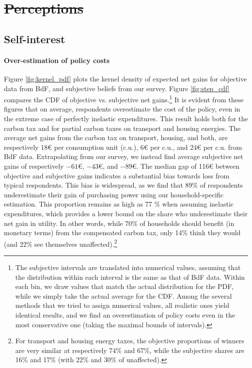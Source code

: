 \documentclass[12pt]{article} %
\providecommand{\DIFaddtex}[1]{{\protect\color{blue}\uwave{#1}}} %
\providecommand{\DIFdeltex}[1]{{\protect\color{red}\sout{#1}}}                      %
\providecommand{\DIFaddbegin}{} %
\providecommand{\DIFaddend}{} %
\providecommand{\DIFdelbegin}{} %
\providecommand{\DIFdelend}{} %
\providecommand{\DIFadd}[1]{\texorpdfstring{\DIFaddtex{#1}}{#1}} %
\providecommand{\DIFdel}[1]{\texorpdfstring{\DIFdeltex{#1}}{}} %
\newcommand{\DIFscaledelfig}{0.5}
\newlength{\DIFdelgraphicswidth} %
\newlength{\DIFdelgraphicsheight} %
\newcommand{\DIFaddincludegraphics}[2][]{{\color{blue}\fbox{\DIFOincludegraphics[#1]{#2}}}} %
\newcommand{\DIFdelincludegraphics}[2][]{%
\sbox{\DIFdelgraphicsbox}{\DIFOincludegraphics[#1]{#2}}%
\settoboxwidth{\DIFdelgraphicswidth}{\DIFdelgraphicsbox} %
\settoboxtotalheight{\DIFdelgraphicsheight}{\DIFdelgraphicsbox} %
\scalebox{\DIFscaledelfig}{%
\parbox[b]{\DIFdelgraphicswidth}{\usebox{\DIFdelgraphicsbox}\\[-\baselineskip] \rule{\DIFdelgraphicswidth}{0em}}\llap{\resizebox{\DIFdelgraphicswidth}{\DIFdelgraphicsheight}{%
\setlength{\unitlength}{\DIFdelgraphicswidth}%
\begin{picture}(1,1)%
\thicklines\linethickness{2pt} %
{\color[rgb]{1,0,0}\put(0,0){\framebox(1,1){}}}%
{\color[rgb]{1,0,0}\put(0,0){\line( 1,1){1}}}%
{\color[rgb]{1,0,0}\put(0,1){\line(1,-1){1}}}%
\end{picture}%
}\hspace*{3pt}}} %
} %
\DeclareRobustCommand{\DIFaddbegin}{\DIFOaddbegin \let\includegraphics\DIFaddincludegraphics} %
\DeclareRobustCommand{\DIFaddend}{\DIFOaddend \let\includegraphics\DIFOincludegraphics} %
\DeclareRobustCommand{\DIFdelbegin}{\DIFOdelbegin \let\includegraphics\DIFdelincludegraphics} %
\DeclareRobustCommand{\DIFdelend}{\DIFOaddend \let\includegraphics\DIFOincludegraphics} %
\begin{document}
\section{\DIFdelbegin \DIFdel{Perceptions}\DIFdelend \DIFaddbegin \DIFadd{Biased beliefs}\DIFaddend }\label{sec:perceptions}

    \subsection{Self-interest}\label{subsec:perc_si}

\paragraph{Over-estimation of policy costs}
Figure \ref{fig:kernel_pdf} plots the kernel density of expected net gains for objective data from BdF, and subjective beliefs from our survey. Figure \ref{fig:step_cdf} compares the CDF of objective vs. subjective net gains.\footnote{The subjective intervals are translated into numerical values, assuming that the distribution within each interval is the same as that of BdF data. Within each bin, we draw values that match the actual distribution for the PDF, while we simply take the actual average for the CDF. Among the several methods that we tried to assign numerical values, all realistic ones yield identical results, and we find an overestimation of policy costs even in the most conservative one (taking the maximal bounds of intervals).} It is evident from these figures that on average, respondents overestimate the cost of the policy, even in the extreme case of perfectly inelastic expenditures. This result holds both for the carbon tax and for partial carbon taxes on transport and housing energies. The average net gains from the carbon tax on transport, housing, and both, are respectively 18\euro{} per consumption unit (c.u.), 6\euro{} per c.u., and 24\euro{} per c.u. from BdF data. Extrapolating from our survey, we instead find average subjective net gains of respectively $-61$\euro{}, $-43$\euro{}, and $-89$\euro{}. The median gap of 116\euro{} between objective and subjective gains indicates a substantial bias towards loss from typical respondents. This bias is widespread, as we find that 89\% of respondents underestimate their gain of purchasing power using our household-specific estimation. This proportion remains as high as 77 \% when assuming inelastic expenditures, which provides a lower bound on the share who underestimate their net gain in utility. In other words, while 70\% of households should benefit (in monetary terms) from the compensated carbon tax, only 14\% think they would (and 22\% see themselves unaffected).\footnote{For transport and housing energy taxes, the objective proportions of winners are very similar at respectively 74\% and 67\%, while the subjective shares are 16\% and 17\% (with 22\% and 30\% of unaffected).}
\end{document}

